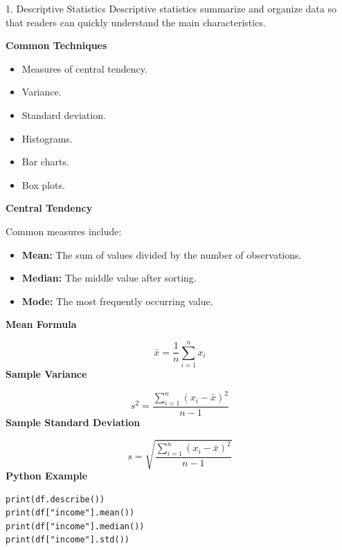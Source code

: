 \documentclass[aspectratio=169,11pt]{beamer}
\begin{document}
\begin{frame}{1. Descriptive Statistics}
\footnotesize
Descriptive statistics summarize and organize data so that readers can quickly understand the main characteristics.\par\medskip
\textbf{Common Techniques}\par\medskip
\begin{itemize}
\item Measures of central tendency.
\item Variance.
\item Standard deviation.
\item Histograms.
\item Bar charts.
\item Box plots.
\end{itemize}
\textbf{Central Tendency}\par\medskip
Common measures include:\par\medskip
\begin{itemize}
\item \textbf{Mean:} The sum of values divided by the number of observations.
\item \textbf{Median:} The middle value after sorting.
\item \textbf{Mode:} The most frequently occurring value.
\end{itemize}
\textbf{Mean Formula}\par\medskip
$$
\bar{x}
=
\frac{1}{n}
\sum_{i=1}^{n}x_i
$$
\textbf{Sample Variance}\par\medskip
$$
s^2
=
\frac{
\sum_{i=1}^{n}(x_i-\bar{x})^2
}{
n-1
}
$$
\textbf{Sample Standard Deviation}\par\medskip
$$
s
=
\sqrt{
\frac{
\sum_{i=1}^{n}(x_i-\bar{x})^2
}{
n-1
}
}
$$
\textbf{Python Example}\par\medskip
\begin{lstlisting}[style=py]
print(df.describe())
print(df["income"].mean())
print(df["income"].median())
print(df["income"].std())
\end{lstlisting}
\end{frame}
\end{document}

